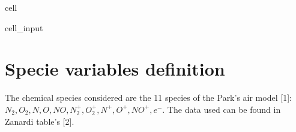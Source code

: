 \documentclass[letterpaper,10pt,english]{jupyterBook}
\begin{document}
\begin{sphinxuseclass}{cell}
\begin{sphinxVerbatimInput}
\begin{sphinxuseclass}{cell_input}
\begin{sphinxVerbatim}[commandchars=\\\{\}]
              
                  
                  
             
        
          
\end{sphinxVerbatim}

\end{sphinxuseclass}\end{sphinxVerbatimInput}

\end{sphinxuseclass}

\chapter{Specie variables definition}
\label{\detokenize{1_Temperature/Specie_class_definition:specie-variables-definition}}
\sphinxAtStartPar
The chemical species considered are the 11 species of the Park’s air model {[}1{]}: \(N_2, O_2, N, O, NO, N_2^+, O_2^+, N^+, O^+, NO^+, e^-\). The data used can be found in Zanardi table’s {[}2{]}.
\end{document}
